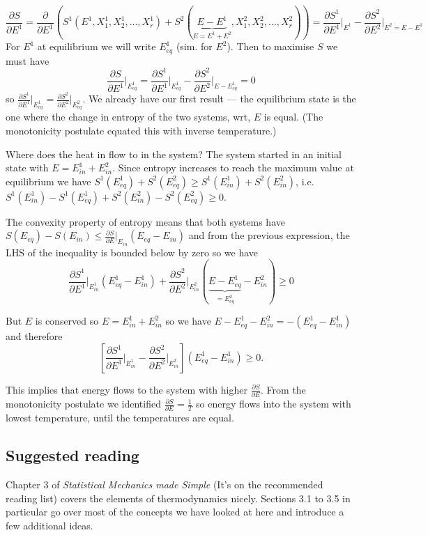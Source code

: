 \documentclass{article}
\begin{document}
$$\frac{\partial S}{\partial E^1} = \frac{\partial}{\partial E^1}\left(S^1(E^1,X_1^1,X_2^1,\ldots,X_r^1) + S^2(\underbrace{E-E^1}_{E=E^1+E^2},X_1^2,X_2^2,\ldots,X_r^2) \right) = \frac{\partial S^1}{\partial E^1}\bigg\vert_{E^1} -  \frac{\partial S^2}{\partial E^2}\bigg\vert_{E^2=E-E^1}$$
For $E^1$ at equilibrium we will write $E^1_{eq}$ (sim. for $E^2$). Then to maximise $S$ we must have
$$\frac{\partial S}{\partial E^1}\bigg\vert_{E^1_{eq}} = \frac{\partial S^1}{\partial E^1}\bigg\vert_{E^1_{eq}} - \frac{\partial S^2}{\partial E^2}\bigg\vert_{E-E^1_{eq}}=0$$
so $\frac{\partial S^1}{\partial E^1}\vert_{E^1_{eq}} = \frac{\partial S^2}{\partial E^2}\vert_{E_{eq}^2}$. We already have our first result --- the equilibrium state is the one where the change in entropy of the two systems, wrt, $E$ is equal. (The  monotonicity postulate equated this with inverse temperature.)

Where does the heat in flow to in the system? The system started in an initial state with $E = E^1_{in}+E^2_{in}$. Since entropy increases to reach the maximum  value at equilibrium we have $S^1(E^1_{eq}) + S^2(E^2_{eq}) \geq S^1(E^1_{in}) + S^2(E^2_{in})$, i.e. $ S^1(E^1_{in}) - S^1(E^1_{eq})  +  S^2(E^2_{in}) - S^2(E^2_{eq})\geq 0$.

The convexity property of entropy means that both systems have $S(E_{eq})-S(E_{in})\leq \frac{\partial S}{\partial E}\vert_{E_{in}}(E_{eq}-E_{in})$ and from the previous expression, the LHS of the inequality is bounded below by zero so we have
$$\frac{\partial S^1}{\partial E^1}\bigg\vert_{E^1_{in}}(E_{eq}^1-E_{in}^1) + \frac{\partial S^2}{\partial E^2}\bigg\vert_{E^2_{in}}(\underbrace{E-E_{eq}^1}_{=E^2_{eq}}-E_{in}^2) \geq 0 $$

But $E$ is conserved so $E=E^1_{in}+E^2_{in}$ so we have $E-E^1_{eq}-E^2_{in} = -(E^1_{eq}-E^1_{in})$ and therefore
$$\left[\frac{\partial S^1}{\partial E^1}\bigg\vert_{E^1_{in}} - \frac{\partial S^2}{\partial E^2}\bigg\vert_{E^2_{in}}\right]\left(E^1_{eq}-E^1_{in}\right)\geq 0.$$

This implies that energy flows to the  system with higher $\frac{\partial S}{\partial E}$. From the monotonicity postulate we identified  $\frac{\partial S}{\partial E}= \frac{1}{T}$ so energy flows into the system with lowest temperature, until the temperatures are equal.

\subsection*{Suggested reading}
Chapter 3 of \emph{Statistical Mechanics made Simple} (It's on the recommended reading list) covers the elements of thermodynamics nicely. Sections 3.1 to 3.5 in particular go over most of the concepts we have looked at here and introduce a few additional ideas.
\end{document}
